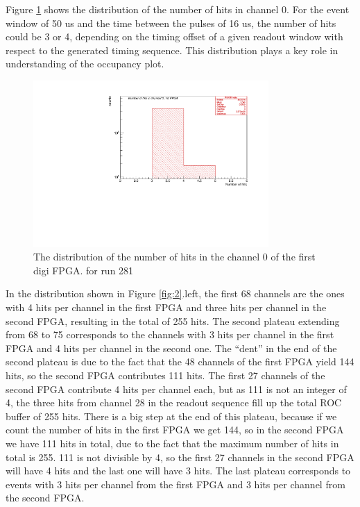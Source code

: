 Figure \ref{fig:66} shows the distribution of the number of hits in channel 0.
For the event window of 50 us and the time between the pulses of 16 us,
the number of hits could be 3 or 4,
depending on the timing offset of a given readout window with respect to the generated timing sequence.
This distribution plays a key role in understanding of the occupancy plot.
\begin{figure}[H]
\centering
\includegraphics[width =0.8\textwidth]{figures/pdf/figure_00066_nhits_ch00_run281.pdf}
\caption{
  The distribution of the number of hits in the channel 0 of the first digi FPGA. for run 281
}
\label{fig:66}
\end{figure}

In the distribution shown in Figure \ref{fig:2}.left,
the first 68 channels are the ones with 4 hits per channel in the first FPGA
and three hits per channel in the second FPGA, 
resulting in the total of 255 hits.
The second plateau extending from 68 to 75 corresponds to the channels
with 3 hits per channel in the first FPGA and 4 hits per channel in the second one.
  The ``dent'' in the end of the second plateau is due to the fact that the 48 channels of the first FPGA
  yield 144 hits, so the second FPGA contributes 111 hits. The first 27 channels of the second FPGA contribute
  4 hits per channel each, but as 111 is not an integer of 4, the three hits from channel 28 in the readout sequence
  fill up the total ROC buffer of 255 hits.
There is a big step at the end of this plateau, because if we count the number of hits
in the first FPGA we get 144, so in the second FPGA we have 111 hits in total,
due to the fact that the maximum number of hits in total is 255.
111 is not divisible by 4, so the first 27 channels in the second FPGA will have 4 hits
and the last one will have 3 hits.
The last plateau corresponds to events with 3 hits per channel from the first FPGA
and 3 hits per channel from the second FPGA.

